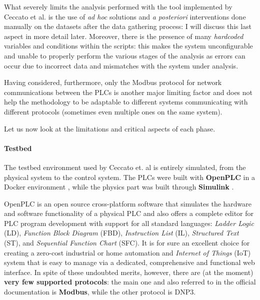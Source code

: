 \bigskip
What severely limits the analysis performed with the tool implemented by Ceccato et al. is the use of \textit{ad hoc} solutions and \textit{a posteriori} interventions done manually on the datasets after the data gathering process: I will discuss this last aspect in more detail later.\newline
Moreover, there is the presence of many \textit{hardcoded} variables and conditions within the scripts: this makes the system unconfigurable and unable to properly perform the various stages of the analysis as errors can occur due to incorrect data and mismatches with the system under analysis.

Having considered, furthermore, only the Modbus protocol for network communications between the PLCs is another major limiting factor and does not help the methodology to be adaptable to different systems communicating with different protocols (sometimes even multiple ones on the same system). 

\bigskip
Let us now look at the limitations and critical aspects of each phase.

\paragraph{Testbed}
\label{par:limit_ceccato_testbed}
The testbed environment used by Ceccato et. al is entirely simulated, from the physical system to the control system. The PLCs were built with \textbf{OpenPLC} \cite{openplc} in a Docker environment \cite{docker}, while the physics part was built through \textbf{Simulink} \cite{simulink}.

\bigskip
OpenPLC is an open source cross-platform software that simulates the hardware and software functionality of a physical PLC and also offers a complete editor for PLC program development with support for all standard languages: \textit{Ladder Logic} (LD), \textit{Function Block Diagram} (FBD), \textit{Instruction List} (IL), \textit{Structured Text} (ST), and \textit{Sequential Function Chart} (SFC).\newline
It is for sure an excellent choice for creating a zero-cost industrial or home automation and \textit{Internet of Things} (IoT) system that is easy to manage via a dedicated, comprehensive and functional web interface. In spite of these undoubted merits, however, there are (at the moment) \textbf{very few supported protocols}: the main one and also referred to in the official documentation is \textbf{Modbus}, while the other protocol is DNP3.

